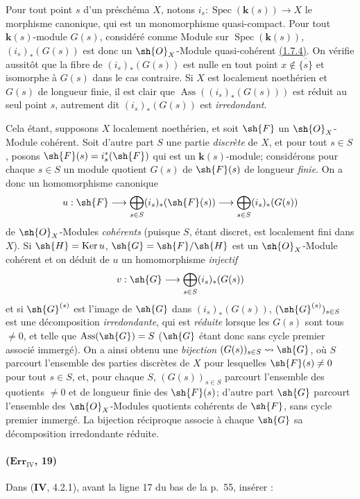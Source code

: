 \begin{remark}[3.2.9]
\label{IV.3.2.9}
Pour tout point $s$ d'un préschéma $X$, notons
$i_s:\operatorname{Spec}(\boldsymbol{k}(s))\to X$ le morphisme canonique, qui est
un monomorphisme quasi-compact. Pour tout $\boldsymbol{k}(s)$-module $G(s)$,
considéré comme Module sur $\operatorname{Spec}(\boldsymbol{k}(s))$,
$(i_s)_*(G(s))$ est donc un $\sh{O}_X$-Module quasi-cohérent
{\hyperref[canon-index.ega4.c04.statement.1-7-4]{(1.7.4)}}. On vérifie aussitôt
que la fibre de $(i_s)_*(G(s))$ est nulle en tout point
$x\notin\overline{\{s\}}$ et isomorphe à $G(s)$ dans le cas contraire.
Si $X$ est localement noethérien et $G(s)$ de longueur finie, il est
clair que $\operatorname{Ass}((i_s)_*(G(s)))$ est réduit au seul point
$s$, autrement dit $(i_s)_*(G(s))$ est \emph{irredondant}.

Cela étant, supposons $X$ localement noethérien, et soit $\sh{F}$ un
$\sh{O}_X$-Module cohérent. Soit d'autre part $S$ une partie \emph{discrète}
de $X$, et pour tout $s\in S$, posons
$\sh{F}(s)=i_s^*(\sh{F})$ qui est un $\boldsymbol{k}(s)$-module; considérons pour
chaque $s\in S$ un module quotient $G(s)$ de $\sh{F}(s)$ de longueur
\emph{finie}. On a donc un homomorphisme canonique
\[
 u:\sh{F}\longrightarrow
 \bigoplus_{s\in S}(i_s)_*(\sh{F}(s))\longrightarrow
 \bigoplus_{s\in S}(i_s)_*(G(s))
\]
de $\sh{O}_X$-Modules \emph{cohérents} (puisque $S$, étant discret, est
localement fini dans $X$). Si $\sh{H}=\operatorname{Ker}u$,
$\sh{G}=\sh{F}/\sh{H}$ est un $\sh{O}_X$-Module cohérent et on déduit
de $u$ un homomorphisme \emph{injectif}
\[
 v:\sh{G}\longrightarrow\bigoplus_{s\in S}(i_s)_*(G(s))
\]
et si $\sh{G}^{(s)}$ est l'image de $\sh{G}$ dans $(i_s)_*(G(s))$,
$(\sh{G}^{(s)})_{s\in S}$ est une décomposition \emph{irredondante}, qui est
\emph{réduite} lorsque les $G(s)$ sont tous $\neq0$, et telle que
$\operatorname{Ass}(\sh{G})=S$ ($\sh{G}$ étant donc sans cycle premier
associé immergé). On a ainsi obtenu une \emph{bijection}
$(G(s))_{s\in S}\leadsto\sh{G}$, où $S$ parcourt l'ensemble des
parties discrètes de $X$ pour lesquelles $\sh{F}(s)\neq0$ pour tout
$s\in S$, et, pour chaque $S$, $(G(s))_{s\in S}$ parcourt l'ensemble
des quotients $\neq0$ et de longueur finie des $\sh{F}(s)$; d'autre
part $\sh{G}$ parcourt l'ensemble des $\sh{O}_X$-Modules quotients
cohérents de $\sh{F}$, sans cycle premier immergé. La bijection
réciproque associe à chaque $\sh{G}$ sa décomposition irredondante
réduite.
\end{remark}

\paragraph{($\mathbf{Err}_{\mathrm{IV}}$, 19)}
Dans (\textbf{IV}, 4.2.1), avant la ligne 17 du bas de la p.~55, insérer :


